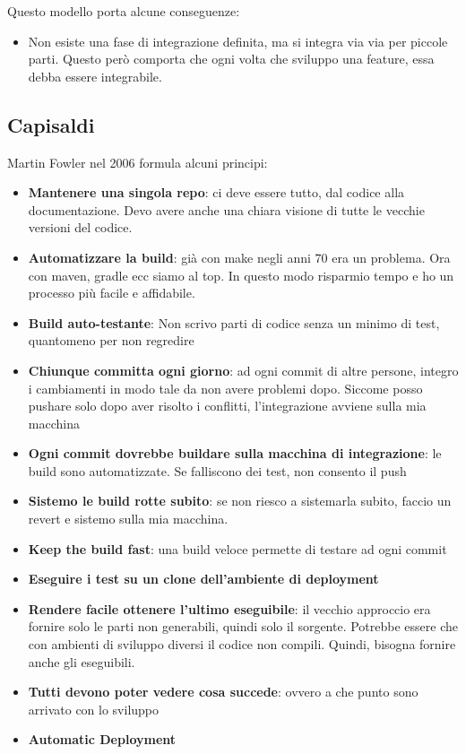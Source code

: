 \documentclass[a4paper,12pt]{article}
\begin{document}

Questo modello porta alcune conseguenze:
\begin{itemize}
\item Non esiste una fase di integrazione definita, ma si integra via via per piccole parti. Questo però comporta che ogni volta che sviluppo una feature, essa debba essere integrabile.
\end{itemize}

\subsection{Capisaldi}
Martin Fowler nel 2006 formula alcuni principi:
\begin{itemize}
\item \textbf{Mantenere una singola repo}: ci deve essere tutto, dal codice alla documentazione. Devo avere anche una chiara visione di tutte le vecchie versioni del codice.
\item \textbf{Automatizzare la build}: già con make negli anni 70 era un problema. Ora con maven, gradle ecc siamo al top. In questo modo risparmio tempo e ho un processo più facile e affidabile.
\item \textbf{Build auto-testante}: Non scrivo parti di codice senza un minimo di test, quantomeno per non regredire
\item \textbf{Chiunque committa ogni giorno}: ad ogni commit di altre persone, integro i cambiamenti in modo tale da non avere problemi dopo. Siccome posso pushare solo dopo aver risolto i conflitti, l'integrazione avviene sulla mia macchina
\item \textbf{Ogni commit dovrebbe buildare sulla macchina di integrazione}: le build sono automatizzate. Se falliscono dei test, non consento il push
\item \textbf{Sistemo le build rotte subito}: se non riesco a sistemarla subito, faccio un revert e sistemo sulla mia macchina.
\item \textbf{Keep the build fast}: una build veloce permette di testare ad ogni commit
\item \textbf{Eseguire i test su un clone dell'ambiente di deployment}
\item \textbf{Rendere facile ottenere l'ultimo eseguibile}: il vecchio approccio era fornire solo le parti non generabili, quindi solo il sorgente. Potrebbe essere che con ambienti di sviluppo diversi il codice non compili. Quindi, bisogna fornire anche gli eseguibili.
\item \textbf{Tutti devono poter vedere cosa succede}: ovvero a che punto sono arrivato con lo sviluppo
\item \textbf{Automatic Deployment}


\end{itemize}
\end{document}
